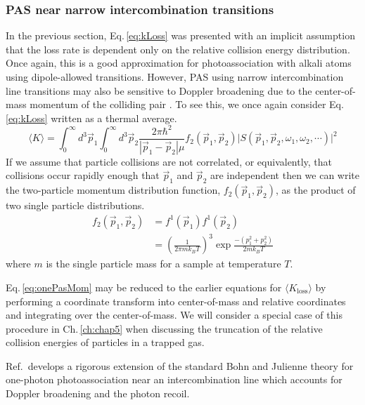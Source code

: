 \subsubsection{PAS near narrow intercombination transitions} \label{sssec:narrow_pa}
In the previous section, Eq.\,\ref{eq:kLoss} was presented with an implicit assumption that the loss rate is dependent only on the relative collision energy distribution.
Once again, this is a good approximation for photoassociation with alkali atoms using dipole-allowed transitions.
However, PAS using narrow intercombination line transitions may also be sensitive to Doppler broadening due to the center-of-mass momentum of the colliding pair \cite{Ciuryo2004}.
To see this, we once again consider Eq.\,\ref{eq:kLoss} written as a thermal average.
\begin{equation} \label{eq:onePasMom}
	 \langle K \rangle = \int_0^{\infty} d^3\vec{p}_1 \int_0^{\infty} d^3\vec{p}_2 \frac{2 \pi \hbar^2}{|\vec{p}_1 - \vec{p}_2| \mu} f_2( \vec{p}_1, \vec{p}_2 ) \vert S(\vec{p}_1, \vec{p}_2, \omega_1, \omega_2, \cdots) \vert^2  
\end{equation}
If we assume that particle collisions are not correlated, or equivalently, that collisions occur rapidly enough that $\vec{p}_1$ and $\vec{p}_2$ are independent then we can write the two-particle momentum distribution function, $f_2( \vec{p}_1, \vec{p}_2 )$, as the product of two single particle distributions. 
\begin{equation}
\label{eq:3two_particle_prob}
\begin{split}
		 f_2( \vec{p}_1, \vec{p}_2 ) &= f^1( \vec{p}_1 ) f^1( \vec{p}_2 ) \\
		  &= \left(\frac{1}{2 \pi m k_B T}\right)^3 \exp{\frac{-(p_1^2 + p_2^2)}{2 m k_B T}}
\end{split}
\end{equation}
where $m$ is the single particle mass for a sample at temperature $T$.

Eq.\,\ref{eq:onePasMom} may be reduced to the earlier equations for $\langle K_{\text{loss}} \rangle$ by performing a coordinate transform into center-of-mass and relative coordinates and integrating over the center-of-mass.
We will consider a special case of this procedure in Ch.\,\ref{ch:chap5} when discussing the truncation of the relative collision energies of particles in a trapped gas.

Ref.\,\cite{Ciuryo2004} develops a rigorous extension of the standard Bohn and Julienne theory for one-photon photoassociation near an intercombination line which accounts for Doppler broadening and the photon recoil.




